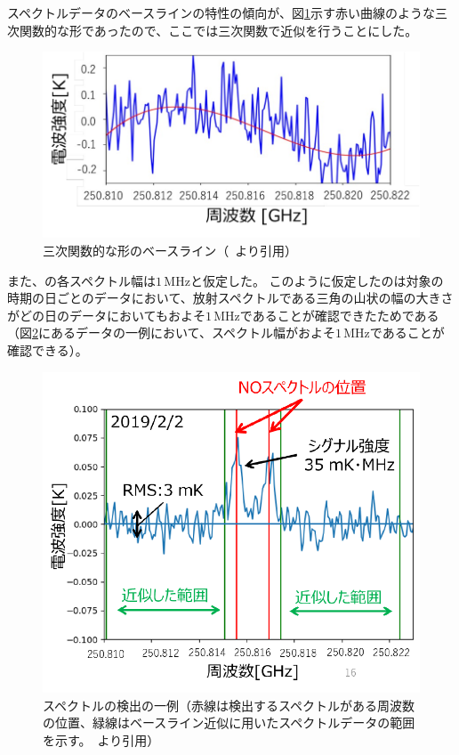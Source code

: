 スペクトルデータのベースラインの特性の傾向が、図\ref{fig:baseline_curve}示す赤い曲線のような三次関数的な形であったので、ここでは三次関数で近似を行うことにした。
\begin{figure}[htbp]
    \centering
    \includegraphics[width=\linewidth]{master_thesis_contents/master_thesis_fig/baseline_curve.pdf}
    \caption{三次関数的な形のベースライン（~\cite{goto2021bachelor}より引用）}
    \label{fig:baseline_curve}
\end{figure}
また、の各スペクトル幅は$1\, \mathrm{MHz}$と仮定した。
このように仮定したのは対象の時期の日ごとのデータにおいて、放射スペクトルである三角の山状の幅の大きさがどの日のデータにおいてもおよそ$1\, \mathrm{MHz}$であることが確認できたためである（図\ref{fig:no_spectr_exp}にあるデータの一例において、スペクトル幅がおよそ$1\, \mathrm{MHz}$であることが確認できる）。
\begin{figure}[htbp]
    \centering
    \includegraphics[width=\linewidth]{master_thesis_contents/master_thesis_fig/no_spectr_exp.pdf}
    \caption{スペクトルの検出の一例（赤線は検出するスペクトルがある周波数の位置、緑線はベースライン近似に用いたスペクトルデータの範囲を示す。~\cite{goto2021bachelor}より引用）}
    \label{fig:no_spectr_exp}
\end{figure}
\clearpage

